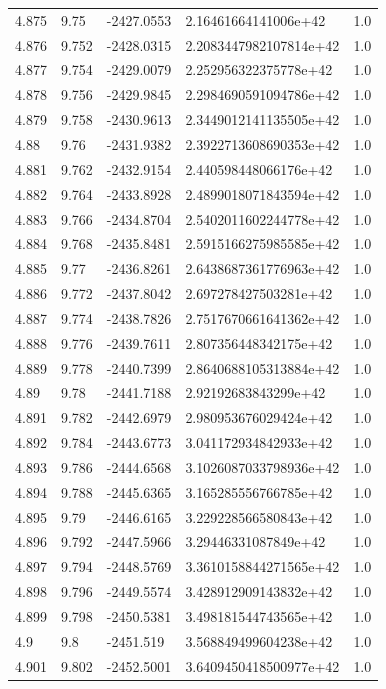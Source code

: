\begin{tabular}{lllll}
4.875 & 9.75 & -2427.0553 & 2.16461664141006e+42 & 1.0 \\
4.876 & 9.752 & -2428.0315 & 2.2083447982107814e+42 & 1.0 \\
4.877 & 9.754 & -2429.0079 & 2.252956322375778e+42 & 1.0 \\
4.878 & 9.756 & -2429.9845 & 2.2984690591094786e+42 & 1.0 \\
4.879 & 9.758 & -2430.9613 & 2.3449012141135505e+42 & 1.0 \\
4.88 & 9.76 & -2431.9382 & 2.3922713608690353e+42 & 1.0 \\
4.881 & 9.762 & -2432.9154 & 2.440598448066176e+42 & 1.0 \\
4.882 & 9.764 & -2433.8928 & 2.4899018071843594e+42 & 1.0 \\
4.883 & 9.766 & -2434.8704 & 2.5402011602244778e+42 & 1.0 \\
4.884 & 9.768 & -2435.8481 & 2.5915166275985585e+42 & 1.0 \\
4.885 & 9.77 & -2436.8261 & 2.6438687361776963e+42 & 1.0 \\
4.886 & 9.772 & -2437.8042 & 2.697278427503281e+42 & 1.0 \\
4.887 & 9.774 & -2438.7826 & 2.7517670661641362e+42 & 1.0 \\
4.888 & 9.776 & -2439.7611 & 2.807356448342175e+42 & 1.0 \\
4.889 & 9.778 & -2440.7399 & 2.8640688105313884e+42 & 1.0 \\
4.89 & 9.78 & -2441.7188 & 2.92192683843299e+42 & 1.0 \\
4.891 & 9.782 & -2442.6979 & 2.980953676029424e+42 & 1.0 \\
4.892 & 9.784 & -2443.6773 & 3.041172934842933e+42 & 1.0 \\
4.893 & 9.786 & -2444.6568 & 3.1026087033798936e+42 & 1.0 \\
4.894 & 9.788 & -2445.6365 & 3.165285556766785e+42 & 1.0 \\
4.895 & 9.79 & -2446.6165 & 3.229228566580843e+42 & 1.0 \\
4.896 & 9.792 & -2447.5966 & 3.29446331087849e+42 & 1.0 \\
4.897 & 9.794 & -2448.5769 & 3.3610158844271565e+42 & 1.0 \\
4.898 & 9.796 & -2449.5574 & 3.428912909143832e+42 & 1.0 \\
4.899 & 9.798 & -2450.5381 & 3.498181544743565e+42 & 1.0 \\
4.9 & 9.8 & -2451.519 & 3.568849499604238e+42 & 1.0 \\
4.901 & 9.802 & -2452.5001 & 3.6409450418500977e+42 & 1.0 \\

\end{tabular}
